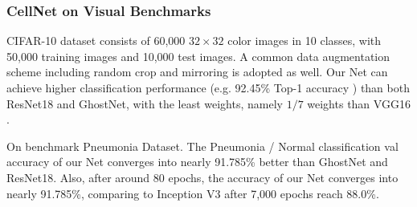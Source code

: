 \subsubsection{CellNet on Visual Benchmarks}



CIFAR-10 dataset\cite{21} consists of 60,000 $32 \times 32$ color images in 10 classes, with 50,000 training images and 10,000 test images. A common data augmentation scheme including random crop\cite{22} and mirroring\cite{19} is adopted as well. Our Net can achieve higher classification performance  (e.g.  92.45\%  Top-1  accuracy  ) than both ResNet18 and GhostNet, with the least  weights, namely $1/7$ weights than VGG16 \cite{23}. 


On benchmark Pneumonia Dataset\cite{38}. The Pneumonia / Normal classification val accuracy of our Net converges into nearly 91.785\% better than GhostNet and ResNet18. Also, after around 80 epochs, the accuracy of our Net converges into nearly 91.785\%, comparing to  Inception V3 after 7,000 epochs reach 88.0\%\cite{38}.

